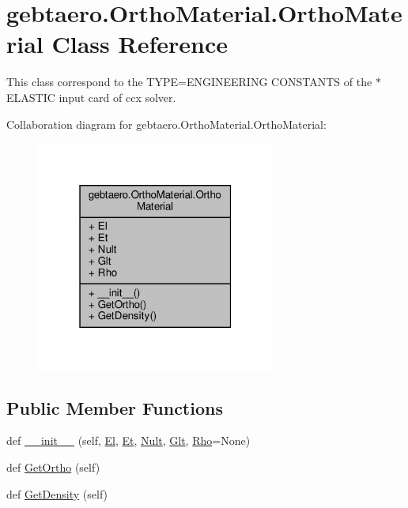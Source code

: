 \hypertarget{classgebtaero_1_1_ortho_material_1_1_ortho_material}{}\section{gebtaero.\+Ortho\+Material.\+Ortho\+Material Class Reference}
\label{classgebtaero_1_1_ortho_material_1_1_ortho_material}


This class correspond to the T\+Y\+PE=E\+N\+G\+I\+N\+E\+E\+R\+I\+NG C\+O\+N\+S\+T\+A\+N\+TS of the $\ast$\+E\+L\+A\+S\+T\+IC input card of ccx solver.  




Collaboration diagram for gebtaero.\+Ortho\+Material.\+Ortho\+Material\+:\nopagebreak
\begin{figure}[H]
\begin{center}
\leavevmode
\includegraphics[width=223pt]{classgebtaero_1_1_ortho_material_1_1_ortho_material__coll__graph}
\end{center}
\end{figure}
\subsection*{Public Member Functions}
\begin{DoxyCompactItemize}
\item 
def \hyperlink{classgebtaero_1_1_ortho_material_1_1_ortho_material_a373dc6b920e8cebeb15f2ba465094c5e}{\+\_\+\+\_\+init\+\_\+\+\_\+} (self, \hyperlink{classgebtaero_1_1_ortho_material_1_1_ortho_material_a06886fe27a343441b7c49bf57ada36c2}{El}, \hyperlink{classgebtaero_1_1_ortho_material_1_1_ortho_material_a7c51660a08aa851b73bba6a7e0457be8}{Et}, \hyperlink{classgebtaero_1_1_ortho_material_1_1_ortho_material_adcae0796a5742c9467e24fe7370e6c32}{Nult}, \hyperlink{classgebtaero_1_1_ortho_material_1_1_ortho_material_a0caf3d15efa1fef5bafed6e6c8d7a5b3}{Glt}, \hyperlink{classgebtaero_1_1_ortho_material_1_1_ortho_material_aa1fa00a17cf09210c0daf5d7bbd07d0d}{Rho}=None)
\item 
def \hyperlink{classgebtaero_1_1_ortho_material_1_1_ortho_material_a281c7c6ffe7db16e3a27c7bfb5b14e3a}{Get\+Ortho} (self)
\item 
def \hyperlink{classgebtaero_1_1_ortho_material_1_1_ortho_material_a803f61a2e841734af169ac4ad4895605}{Get\+Density} (self)
\end{DoxyCompactItemize}
